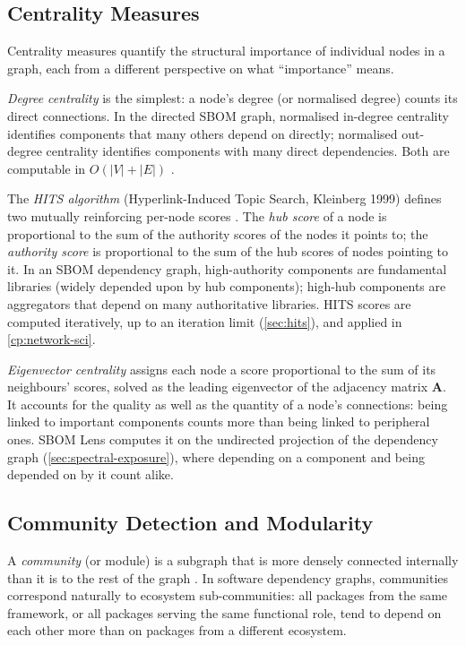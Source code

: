 \subsection{Centrality Measures}
\label{sec:centrality}

Centrality measures quantify the structural importance of individual nodes in a graph, each from a different perspective on what ``importance'' means.

\textit{Degree centrality} is the simplest: a node's degree (or normalised degree) counts its direct connections. In the directed SBOM graph, normalised in-degree centrality identifies components that many others depend on directly; normalised out-degree centrality identifies components with many direct dependencies. Both are computable in \(O(|V| + |E|)\) \citep{Barabasi2016}.

The \textit{HITS algorithm} (Hyperlink-Induced Topic Search, Kleinberg 1999) defines two mutually reinforcing per-node scores \citep{Kleinberg1999}. The \textit{hub score} of a node is proportional to the sum of the authority scores of the nodes it points to; the \textit{authority score} is proportional to the sum of the hub scores of nodes pointing to it. In an SBOM dependency graph, high-authority components are fundamental libraries (widely depended upon by hub components); high-hub components are aggregators that depend on many authoritative libraries. HITS scores are computed iteratively, up to an iteration limit (\autoref{sec:hits}), and applied in \autoref{cp:network-sci}.

\textit{Eigenvector centrality} assigns each node a score proportional to the sum of its neighbours' scores, solved as the leading eigenvector of the adjacency matrix \(\mathbf{A}\). It accounts for the quality as well as the quantity of a node's connections: being linked to important components counts more than being linked to peripheral ones. SBOM Lens computes it on the undirected projection of the dependency graph (\autoref{sec:spectral-exposure}), where depending on a component and being depended on by it count alike.


\subsection{Community Detection and Modularity}
\label{sec:community-detection}

A \textit{community} (or module) is a subgraph that is more densely connected internally than it is to the rest of the graph \citep{Barabasi2016}. In software dependency graphs, communities correspond naturally to ecosystem sub-communities: all packages from the same framework, or all packages serving the same functional role, tend to depend on each other more than on packages from a different ecosystem.

